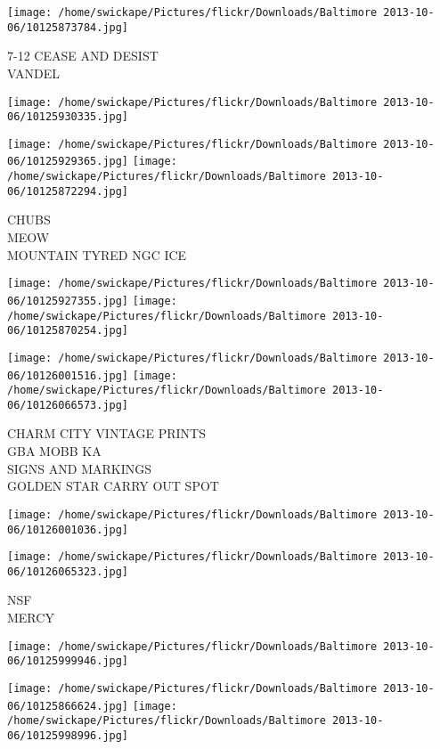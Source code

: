 \documentclass[10pt,letterpaper]{article}
\begin{document}
\vspace{0.25in}
\texttt{[image: /home/swickape/Pictures/flickr/Downloads/Baltimore 2013-10-06/10125873784.jpg]}

7{-}12 CEASE AND DESIST\\
VANDEL\\
\pagebreak

\texttt{[image: /home/swickape/Pictures/flickr/Downloads/Baltimore 2013-10-06/10125930335.jpg]}

\vspace{0.25in}
\texttt{[image: /home/swickape/Pictures/flickr/Downloads/Baltimore 2013-10-06/10125929365.jpg]}
\texttt{[image: /home/swickape/Pictures/flickr/Downloads/Baltimore 2013-10-06/10125872294.jpg]}

CHUBS\\
MEOW\\
MOUNTAIN TYRED NGC ICE\\
\pagebreak

\texttt{[image: /home/swickape/Pictures/flickr/Downloads/Baltimore 2013-10-06/10125927355.jpg]}
\texttt{[image: /home/swickape/Pictures/flickr/Downloads/Baltimore 2013-10-06/10125870254.jpg]}

\texttt{[image: /home/swickape/Pictures/flickr/Downloads/Baltimore 2013-10-06/10126001516.jpg]}
\texttt{[image: /home/swickape/Pictures/flickr/Downloads/Baltimore 2013-10-06/10126066573.jpg]}

CHARM CITY VINTAGE PRINTS\\
GBA MOBB KA\\
SIGNS AND MARKINGS\\
GOLDEN STAR CARRY OUT SPOT\\
\pagebreak

\texttt{[image: /home/swickape/Pictures/flickr/Downloads/Baltimore 2013-10-06/10126001036.jpg]}

\vspace{0.25in}
\texttt{[image: /home/swickape/Pictures/flickr/Downloads/Baltimore 2013-10-06/10126065323.jpg]}

NSF\\
MERCY\\
\pagebreak

\texttt{[image: /home/swickape/Pictures/flickr/Downloads/Baltimore 2013-10-06/10125999946.jpg]}

\vspace{0.25in}
\texttt{[image: /home/swickape/Pictures/flickr/Downloads/Baltimore 2013-10-06/10125866624.jpg]}
\texttt{[image: /home/swickape/Pictures/flickr/Downloads/Baltimore 2013-10-06/10125998996.jpg]}
\end{document}
